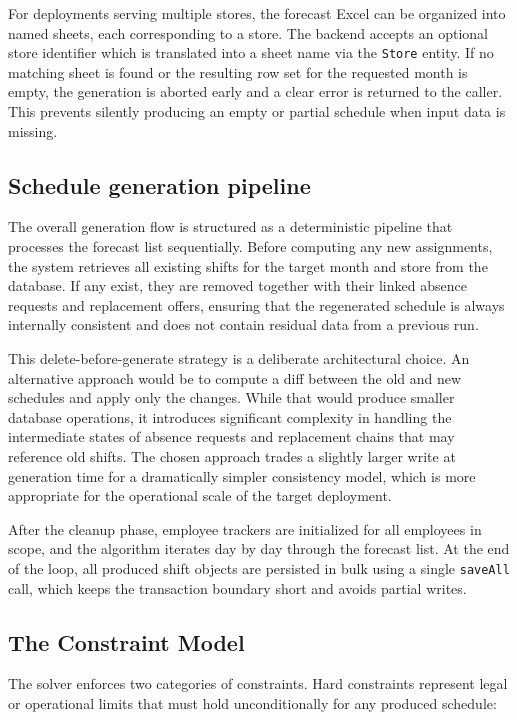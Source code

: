\par For deployments serving multiple stores, the forecast Excel can be organized into named sheets, each corresponding to a store. The backend accepts an optional store identifier which is translated into a sheet name via the \texttt{Store} entity. If no matching sheet is found or the resulting row set for the requested month is empty, the generation is aborted early and a clear error is returned to the caller. This prevents silently producing an empty or partial schedule when input data is missing.

\subsection{Schedule generation pipeline}
\par The overall generation flow is structured as a deterministic pipeline that processes the forecast list sequentially. Before computing any new assignments, the system retrieves all existing shifts for the target month and store from the database. If any exist, they are removed together with their linked absence requests and replacement offers, ensuring that the regenerated schedule is always internally consistent and does not contain residual data from a previous run.

\par This delete-before-generate strategy is a deliberate architectural choice. An alternative approach would be to compute a diff between the old and new schedules and apply only the changes. While that would produce smaller database operations, it introduces significant complexity in handling the intermediate states of absence requests and replacement chains that may reference old shifts. The chosen approach trades a slightly larger write at generation time for a dramatically simpler consistency model, which is more appropriate for the operational scale of the target deployment.

\par After the cleanup phase, employee trackers are initialized for all employees in scope, and the algorithm iterates day by day through the forecast list. At the end of the loop, all produced shift objects are persisted in bulk using a single \texttt{saveAll} call, which keeps the transaction boundary short and avoids partial writes.

\subsection{The Constraint Model}
\par The solver enforces two categories of constraints. Hard constraints represent legal or operational limits that must hold unconditionally for any produced schedule:

